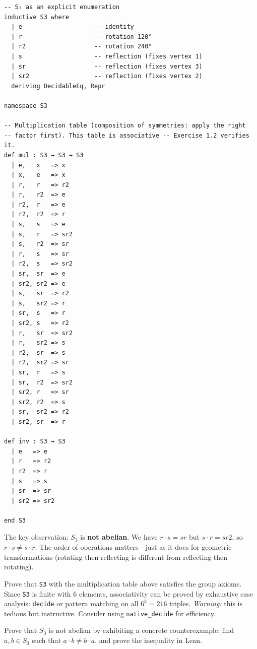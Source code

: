 \documentclass[11pt, a4paper, oneside]{book}
\newcommand{\lc}[1]{\texttt{#1}}
\newcounter{exercise}[chapter]
\begin{document}
\begin{leanbox}
\begin{verbatim}
-- S₃ as an explicit enumeration
inductive S3 where
  | e                    -- identity
  | r                    -- rotation 120°
  | r2                   -- rotation 240°
  | s                    -- reflection (fixes vertex 1)
  | sr                   -- reflection (fixes vertex 3)
  | sr2                  -- reflection (fixes vertex 2)
  deriving DecidableEq, Repr

namespace S3

-- Multiplication table (composition of symmetries: apply the right
-- factor first). This table is associative -- Exercise 1.2 verifies it.
def mul : S3 → S3 → S3
  | e,   x   => x
  | x,   e   => x
  | r,   r   => r2
  | r,   r2  => e
  | r2,  r   => e
  | r2,  r2  => r
  | s,   s   => e
  | s,   r   => sr2
  | s,   r2  => sr
  | r,   s   => sr
  | r2,  s   => sr2
  | sr,  sr  => e
  | sr2, sr2 => e
  | s,   sr  => r2
  | s,   sr2 => r
  | sr,  s   => r
  | sr2, s   => r2
  | r,   sr  => sr2
  | r,   sr2 => s
  | r2,  sr  => s
  | r2,  sr2 => sr
  | sr,  r   => s
  | sr,  r2  => sr2
  | sr2, r   => sr
  | sr2, r2  => s
  | sr,  sr2 => r2
  | sr2, sr  => r

def inv : S3 → S3
  | e   => e
  | r   => r2
  | r2  => r
  | s   => s
  | sr  => sr
  | sr2 => sr2

end S3
\end{verbatim}
\end{leanbox}

The key observation: $S_3$ is \textbf{not abelian}. We have $r \cdot s = sr$
but $s \cdot r = sr2$, so $r \cdot s \neq s \cdot r$. The order of
operations matters---just as it does for geometric transformations (rotating
then reflecting is different from reflecting then rotating).

\begin{exercisebox}[title={Exercise 1.2}]
Prove that \lc{S3} with the multiplication table above satisfies the group
axioms. Since \lc{S3} is finite with 6 elements, associativity can be proved
by exhaustive case analysis: \lc{decide} or pattern matching on all $6^3 = 216$
triples. \emph{Warning:} this is tedious but instructive. Consider using
\lc{native\_decide} for efficiency.
\end{exercisebox}

\begin{exercisebox}[title={Exercise 1.3}]
Prove that $S_3$ is not abelian by exhibiting a concrete counterexample:
find $a, b \in S_3$ such that $a \cdot b \neq b \cdot a$, and prove the
inequality in Lean.
\end{exercisebox}
\end{document}
